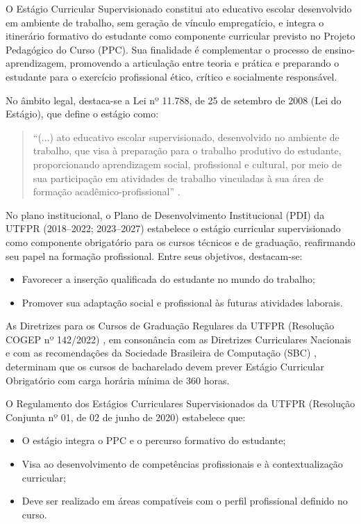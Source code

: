 O Estágio Curricular Supervisionado constitui ato educativo escolar desenvolvido em ambiente de trabalho, sem geração de vínculo empregatício, e integra o itinerário formativo do estudante como componente curricular previsto no Projeto Pedagógico do Curso (PPC). Sua finalidade é complementar o processo de ensino-aprendizagem, promovendo a articulação entre teoria e prática e preparando o estudante para o exercício profissional ético, crítico e socialmente responsável.

No âmbito legal, destaca-se a Lei nº 11.788, de 25 de setembro de 2008 (Lei do Estágio), que define o estágio como:
\begin{quote}
    “(...) ato educativo escolar supervisionado, desenvolvido no ambiente de trabalho, que visa à preparação para o trabalho produtivo do estudante, proporcionando aprendizagem social, profissional e cultural, por meio de sua participação em atividades de trabalho vinculadas à sua área de formação acadêmico-profissional” \cite{LDE_2008}.
\end{quote}

No plano institucional, o Plano de Desenvolvimento Institucional (PDI) da UTFPR (2018--2022; 2023--2027) \cite{UTFPR_PDI_2017, UTFPR_PDI_2023} estabelece o estágio curricular supervisionado como componente obrigatório para os cursos técnicos e de graduação, reafirmando seu papel na formação profissional. Entre seus objetivos, destacam-se:

\begin{itemize}
    \item Favorecer a inserção qualificada do estudante no mundo do trabalho;
    \item Promover sua adaptação social e profissional às futuras atividades laborais.
\end{itemize}

As Diretrizes para os Cursos de Graduação Regulares da UTFPR (Resolução COGEP nº 142/2022) \cite{UTFPR_DC_2022}, em consonância com as Diretrizes Curriculares Nacionais \cite{DCN_2011, MEC_2016} e com as recomendações da Sociedade Brasileira de Computação (SBC) \cite{SBC_2017, SBC_REF_CD_2023, SBC_REF_IA_2024}, determinam que os cursos de bacharelado devem prever Estágio Curricular Obrigatório com carga horária mínima de 360 horas.

O Regulamento dos Estágios Curriculares Supervisionados da UTFPR (Resolução Conjunta nº 01, de 02 de junho de 2020) \cite{Estagio_2020} estabelece que:

\begin{itemize}
    \item O estágio integra o PPC e o percurso formativo do estudante;
    \item Visa ao desenvolvimento de competências profissionais e à contextualização curricular;
    \item Deve ser realizado em áreas compatíveis com o perfil profissional definido no curso.
\end{itemize}

